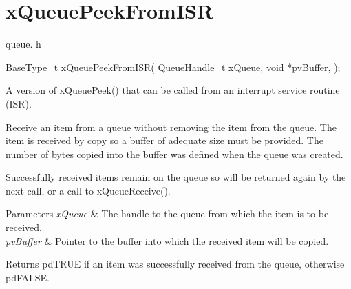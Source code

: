 \hypertarget{group__x_queue_peek_from_i_s_r}{}\section{x\+Queue\+Peek\+From\+I\+S\+R}
\label{group__x_queue_peek_from_i_s_r}
queue. h 
\begin{DoxyPre}
BaseType\_t xQueuePeekFromISR(
                                QueueHandle\_t xQueue,
                                void *pvBuffer,
                            );\end{DoxyPre}


A version of x\+Queue\+Peek() that can be called from an interrupt service routine (I\+S\+R).

Receive an item from a queue without removing the item from the queue. The item is received by copy so a buffer of adequate size must be provided. The number of bytes copied into the buffer was defined when the queue was created.

Successfully received items remain on the queue so will be returned again by the next call, or a call to x\+Queue\+Receive().


\begin{DoxyParams}{Parameters}
{\em x\+Queue} & The handle to the queue from which the item is to be received.\\
\hline
{\em pv\+Buffer} & Pointer to the buffer into which the received item will be copied.\\
\hline
\end{DoxyParams}
\begin{DoxyReturn}{Returns}
pd\+T\+R\+U\+E if an item was successfully received from the queue, otherwise pd\+F\+A\+L\+S\+E. 
\end{DoxyReturn}
